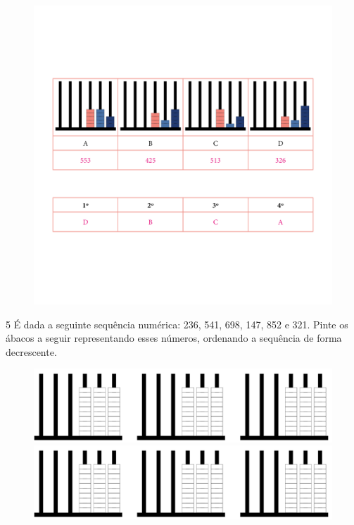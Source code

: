 \begin{figure}[htpb!]
\includegraphics[width=\textwidth]{./media/image6_prof.png}
\end{figure}



\num{5} É dada a seguinte sequência numérica: 236, 541, 698, 147, 852 e 321. Pinte os
ábacos a seguir representando esses números, ordenando a sequência de forma decrescente.

\begin{figure}[htpb!]
\includegraphics[width=\textwidth]{./media/image7b.png}
\includegraphics[width=\textwidth]{./media/image7b.png}
\end{figure}

